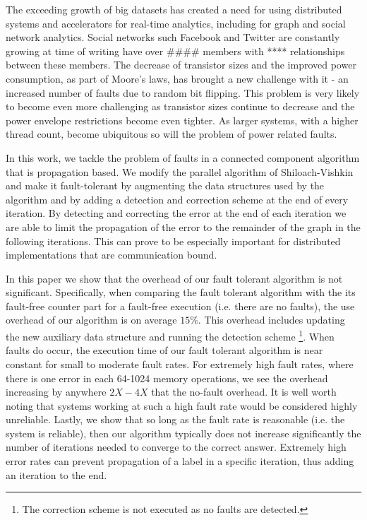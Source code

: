 

The exceeding growth of big datasets has created a need for using distributed systems and 
accelerators for real-time analytics, including for graph and social network analytics. Social 
networks such Facebook and Twitter are constantly growing  at time of writing have over #### 
members with **** relationships between these members.
The decrease of transistor sizes and the improved power consumption, as part of Moore's laws, has 
brought a new challenge with it - an increased number of faults due to random bit flipping. This 
problem is very likely to become even more challenging as transistor sizes continue to decrease and 
the power envelope restrictions become even tighter. As larger systems, with a higher thread count, 
become ubiquitous so will the problem of power related faults.

In this work, we tackle the problem of faults in a connected component algorithm that is 
propagation based. We modify the parallel algorithm of Shiloach-Vishkin \cite{ShiloachVishkin} and 
make it fault-tolerant by augmenting the data structures used by the algorithm and by adding a 
detection and correction scheme at the end of every iteration. By detecting and correcting the 
error at the end of each iteration we are able to limit the propagation of the error to the 
remainder of the graph in the following iterations. This can prove to be especially important for 
distributed implementations that are communication bound.


In this paper we show that the overhead of our fault tolerant algorithm is not significant. 
Specifically, when comparing the fault tolerant algorithm with the its fault-free counter part for 
a fault-free execution (i.e. there are no faults), the use overhead of our algorithm is on average 
$15\%$. This overhead includes updating the new auxiliary data structure and running the detection 
scheme \footnote{The correction scheme is not executed as no faults are detected.}. When faults do 
occur, the execution time of our fault tolerant algorithm is near constant for small to moderate 
fault rates. For extremely high fault rates, where there is one error in each 64-1024 memory 
operations, we see the overhead increasing by anywhere $2X-4X$ that the no-fault overhead. It is 
well worth noting that systems working at such a high fault rate would be considered highly 
unreliable. Lastly, we show that so long as the fault rate is reasonable (i.e. the system is 
reliable), then our algorithm typically does not increase significantly the number of iterations 
needed to converge to the correct answer. Extremely high error rates can prevent propagation of a
label in a specific iteration, thus adding an iteration to the end.


